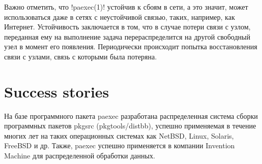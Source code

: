 \documentclass[10pt, a5paper]{article}
\begin{document}
Важно отметить, что \progref!paexec(1)! устойчив к сбоям в сети, а это значит,
может использоваться даже в сетях с неустойчивой связью, таких,
например, как Интернет. Устойчивость заключается в том, что в случае
потери связи с узлом, переданная ему на выполнение задача
перераспределится на другой свободный узел в момент его появления.
Периодически происходит попытка восстановления связи с узлами, связь с
которыми была потеряна.

\section*{Success stories}
На базе программного пакета paexec разработана
распределенная система сборки программных пакетов pkgsrc
(pkgtools/dist\-bb), успешно применяемая в течение многих лет на таких
операционных системах как NetBSD, Linux, Solaris, FreeBSD и др. Также,
paexec успешно применяется в компании Invention Machine для
распределенной обработки данных.
\end{document}
